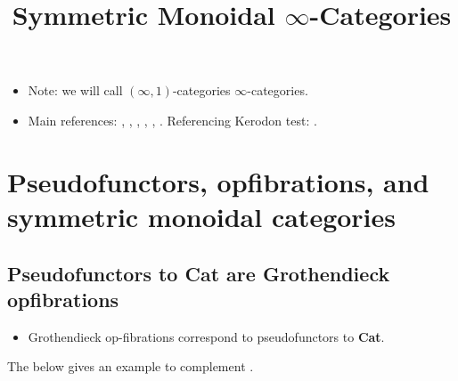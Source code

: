 \documentclass{MetricNotes2023}
\title{Symmetric Monoidal \(\infty\)-Categories}
\date{\vspace{-5ex}}
\begin{document}
\maketitle
%

\DeclarePairedDelimiter{\norm}{\lVert}{\rVert} 
\DeclarePairedDelimiter{\abs}{\lvert}{\rvert} 
\DeclarePairedDelimiter{\ang}{\langle}{\rangle} 

\begin{itemize}
\item Note: we will call \((\infty, 1)\)-categories \(\infty\)-categories. 
\item Main references: \autocite{higheralgebra}, \autocite{lurie2008higher}, \autocite{symmetricmonoidal}, \autocite{goodfibrations}, \autocite{groth2015short}, \autocite{kerodon}. Referencing Kerodon test: \cite[\href{https://kerodon.net/tag/01UB}{Example 01UB}]{kerodon}. 
\end{itemize}

\section{Pseudofunctors, opfibrations, and symmetric monoidal categories}

\subsection{Pseudofunctors to \textbf{Cat} are Grothendieck opfibrations}

\begin{itemize}
\item Grothendieck op-fibrations correspond to pseudofunctors to \textbf{Cat}.
\end{itemize}

The below gives an example to complement \autocite{symmetricmonoidal}.
\end{document}
